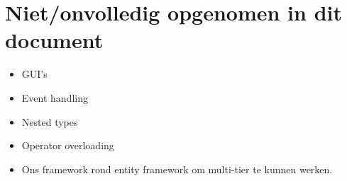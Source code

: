 \documentclass[a4paper,11pt]{article}
\begin{document}
\section{Niet/onvolledig opgenomen in dit document}

\begin{itemize}
\item GUI's
\item Event handling
\item Nested types
\item Operator overloading
\item Ons framework rond entity framework om multi-tier te kunnen werken.
\end{itemize}

\printindex
\end{document}
